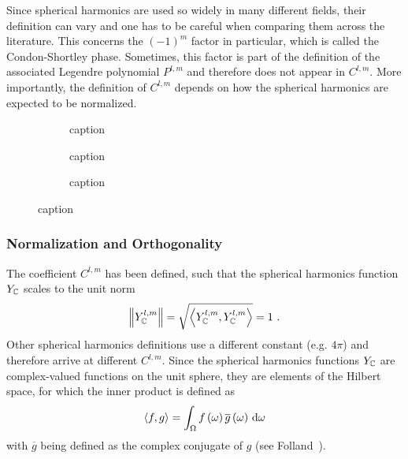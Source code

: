 Since spherical harmonics are used so widely in many different fields, their definition can vary and one has to be careful when comparing them across the literature. This concerns the $(-1)^m$ factor in particular, which is called the Condon-Shortley phase. Sometimes, this factor is part of the definition of the associated Legendre polynomial $P^{l,m}$ and therefore does not appear in $C^{l,m}$. More importantly, the definition of $C^{l,m}$ depends on how the spherical harmonics are expected to be normalized.
\begin{figure}[h]
\centering
\begin{subfigure}{0.31\columnwidth}
\caption{caption}
\label{fig:sh_vis_1}
\end{subfigure}
\hspace{0.01\columnwidth}
\begin{subfigure}{0.31\columnwidth}
\caption{caption}
\label{fig:sh_vis_2}
\end{subfigure}
\hspace{0.01\columnwidth}
\begin{subfigure}{0.31\columnwidth}
\caption{caption}
\label{fig:sh_vis_3}
\end{subfigure}%
\caption{caption}
\label{fig:sh_vis}
\end{figure}

\subsubsection*{Normalization and Orthogonality}

The coefficient $C^{l,m}$ has been defined, such that the spherical harmonics function $Y_{\mathbb{C}}$ scales to the unit norm
\begin{align}
\label{eq:sh_normalization}
\left\lVert Y_{\mathbb{C}}^{l,m}\right\rVert = \sqrt{\left<Y_{\mathbb{C}}^{l,m}, Y_{\mathbb{C}}^{l,m}\right>} = 1
\ .
\end{align}
Other spherical harmonics definitions use a different constant (e.g. $4\pi$) and therefore arrive at different $C^{l,m}$. Since the spherical harmonics functions $Y_{\mathbb{C}}$ are complex-valued functions on the unit sphere, they are elements of the Hilbert space, for which the inner product is defined as
\begin{align}
\label{eq:sh_inner_product}
\left<f,g\right> = \int_\Omega f\left(\omega\right)\overline{g}\left(\omega\right)\,\mathrm{d}\omega
\end{align}
with $\overline{g}$ being defined as the complex conjugate of $g$ (see Folland~\cite{Folland92}).


